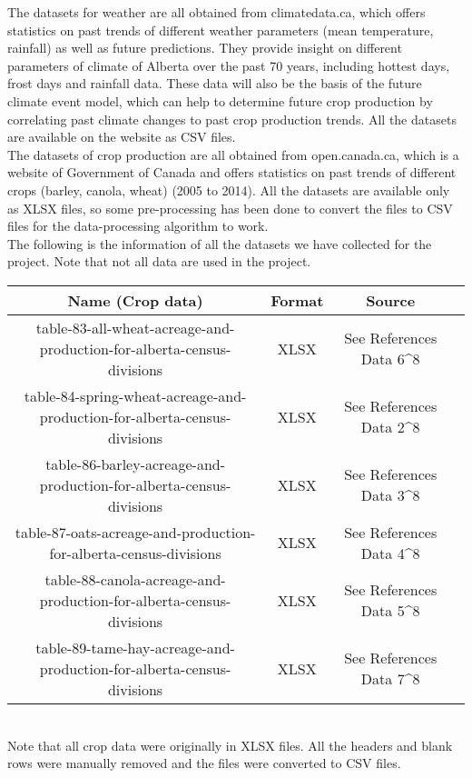 \documentclass[fontsize=11pt]{article}
\begin{document}
The datasets for weather are all obtained from climatedata.ca, which offers statistics on past trends of different weather parameters (mean temperature, rainfall) as well as future predictions. They provide insight on different parameters of climate of Alberta over the past 70 years, including hottest days, frost days and rainfall data. These data will also be the basis of the future climate event model, which can help to determine future crop production by correlating past climate changes to past crop production trends. All the datasets are available on the website as CSV files.\\

The datasets of crop production are all obtained from open.canada.ca, which is a website of Government of Canada and offers statistics on past trends of different crops (barley, canola, wheat) (2005 to 2014). All the datasets are available only as XLSX files, so some pre-processing has been done to convert the files to CSV files for the data-processing algorithm to work.\\

The following is the information of all the datasets we have collected for the project. Note that not all data are used in the project. 

\begin{tabular}{||c|c|c|c||}
    \hline
    Name (Crop data) & Format & Source\\
    \hline
    table-83-all-wheat-acreage-and-production-for-alberta-census-divisions & XLSX & See References Data 6^8 \\
    table-84-spring-wheat-acreage-and-production-for-alberta-census-divisions & XLSX & See References Data 2^8 \\
    table-86-barley-acreage-and-production-for-alberta-census-divisions & XLSX & See References Data 3^8 \\
    table-87-oats-acreage-and-production-for-alberta-census-divisions & XLSX & See References Data 4^8 \\
    table-88-canola-acreage-and-production-for-alberta-census-divisions & XLSX & See References Data 5^8 \\
    table-89-tame-hay-acreage-and-production-for-alberta-census-divisions & XLSX & See References Data 7^8 \\
    \hline
\end{tabular}
\\


Note that all crop data were originally in XLSX files. All the headers and blank rows were manually removed and the files were converted to CSV files. \\
\end{document}
